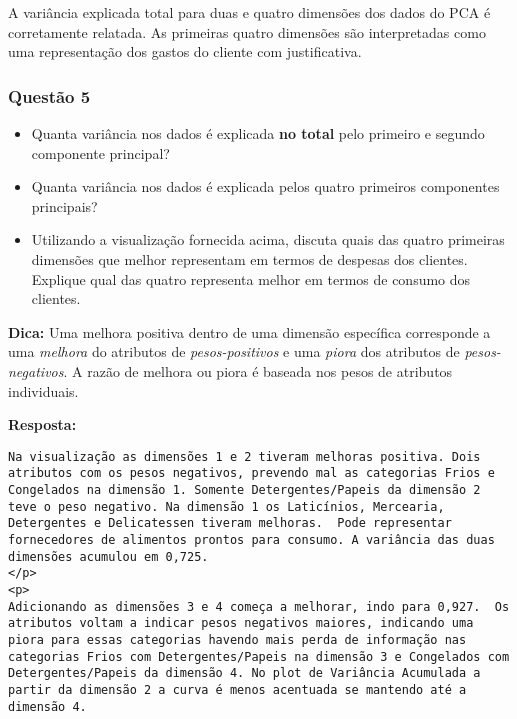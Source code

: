 \documentclass[11pt]{article}
\providecommand{\tightlist}{%
      \setlength{\itemsep}{0pt}\setlength{\parskip}{0pt}}
\begin{document}
     A variância explicada total para duas e quatro dimensões dos dados do
PCA é corretamente relatada. As primeiras quatro dimensões são
interpretadas como uma representação dos gastos do cliente com
justificativa. 

    \subsubsection{Questão 5}\label{questuxe3o-5}

\begin{itemize}
\tightlist
\item
  Quanta variância nos dados é explicada \textbf{no total} pelo primeiro
  e segundo componente principal?
\item
  Quanta variância nos dados é explicada pelos quatro primeiros
  componentes principais?
\item
  Utilizando a visualização fornecida acima, discuta quais das quatro
  primeiras dimensões que melhor representam em termos de despesas dos
  clientes. Explique qual das quatro representa melhor em termos de
  consumo dos clientes.
\end{itemize}

\textbf{Dica:} Uma melhora positiva dentro de uma dimensão específica
corresponde a uma \emph{melhora} do atributos de \emph{pesos-positivos}
e uma \emph{piora} dos atributos de \emph{pesos-negativos}. A razão de
melhora ou piora é baseada nos pesos de atributos individuais.

    \textbf{Resposta:}

\begin{verbatim}
Na visualização as dimensões 1 e 2 tiveram melhoras positiva. Dois atributos com os pesos negativos, prevendo mal as categorias Frios e Congelados na dimensão 1. Somente Detergentes/Papeis da dimensão 2 teve o peso negativo. Na dimensão 1 os Laticínios, Mercearia, Detergentes e Delicatessen tiveram melhoras.  Pode representar fornecedores de alimentos prontos para consumo. A variância das duas dimensões acumulou em 0,725.
</p>
<p>
Adicionando as dimensões 3 e 4 começa a melhorar, indo para 0,927.  Os atributos voltam a indicar pesos negativos maiores, indicando uma piora para essas categorias havendo mais perda de informação nas categorias Frios com Detergentes/Papeis na dimensão 3 e Congelados com Detergentes/Papeis da dimensão 4. No plot de Variância Acumulada a partir da dimensão 2 a curva é menos acentuada se mantendo até a dimensão 4. 
\end{verbatim}
\end{document}
